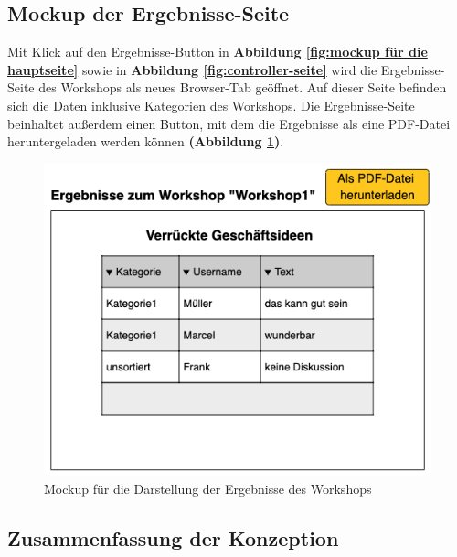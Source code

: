 \subsection{Mockup der Ergebnisse-Seite}
\label{subsec:mockup der ergebnisse-seite}
Mit Klick auf den Ergebnisse-Button in \textbf{Abbildung \ref{fig:mockup für die hauptseite}} sowie in \textbf{Abbildung \ref{fig:controller-seite}} wird die Ergebnisse-Seite des Workshops als neues Browser-Tab geöffnet. Auf dieser Seite befinden sich die Daten inklusive Kategorien des Workshops. Die Ergebnisse-Seite beinhaltet außerdem einen Button, mit dem die Ergebnisse als eine PDF-Datei heruntergeladen werden können \textbf{(Abbildung \ref{fig:mockup für die darstellung der ergebnisse des workshops})}.

\begin{figure}[H]
  \begin{center}
    \includegraphics[scale=0.45]{img/ergebnisse_seite}
	\caption{Mockup für die Darstellung der Ergebnisse des Workshops}  
	\label{fig:mockup für die darstellung der ergebnisse des workshops}
  \end{center}   
\end{figure}

\subsection{Zusammenfassung der Konzeption}
\label{subsec:zusammenfassung der konzeption}

